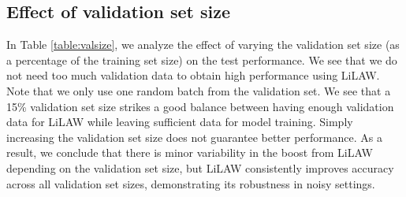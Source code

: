 \documentclass{article}
\theoremstyle{plain}
\theoremstyle{definition}
\theoremstyle{remark}
\begin{document}
\subsection{Effect of validation set size}
\label{supp:valsize}

In Table \ref{table:valsize}, we analyze the effect of varying the validation set size (as a percentage of the training set size) on the test performance. We see that we do not need too much validation data to obtain high performance using LiLAW. Note that we only use one random batch from the validation set. We see that a 15\% validation set size strikes a good balance between having enough validation data for LiLAW while leaving sufficient data for model training. Simply increasing the validation set size does not guarantee better performance. As a result, we conclude that there is minor variability in the boost from LiLAW depending on the validation set size, but LiLAW consistently improves accuracy across all validation set sizes, demonstrating its robustness in noisy settings.
\end{document}
